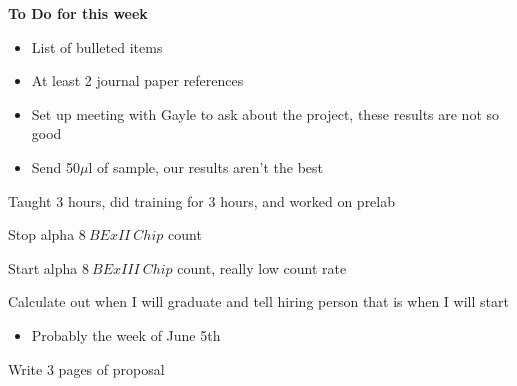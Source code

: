 \documentclass[idxtotoc,hyperref,openany,oneside]{labbook} %
\newcommand{\cmark}{\ding{51}}%
\newcommand{\xmark}{\ding{55}}%
\newcommand{\done}{\rlap{$\square$}{\raisebox{2pt}{\large\hspace{1pt}\cmark}}%
  \hspace{-2.5pt}}
\newcommand{\wontfix}{\rlap{$\square$}{\large\hspace{1pt}\xmark}}
\begin{document}
\textbf{To Do for this week}
\begin{itemize}
\item{List of bulleted items}
\item{At least 2 journal paper references}
\item{Set up meeting with Gayle to ask about the project, these results are not so good}
\item{Send 50$\mu$l of sample, our results aren't the best}
\end{itemize}








Taught 3 hours, did training for 3 hours, and worked on prelab


\begin{todolist}
\item[\done]{Stop alpha $\boxed{8\ BExII\ Chip}$ count}
\item[\done]{Start alpha $\boxed{8\ BExIII\ Chip}$ count, really low count rate}
\end{todolist}


\begin{todolist}
\item[\done]{Calculate out when I will graduate and tell hiring person that is when
  I will start}
  \begin{itemize}
  \item{Probably the week of June 5th}
  \end{itemize}
\item{Write 3 pages of proposal}
\end{todolist}





\end{document}
